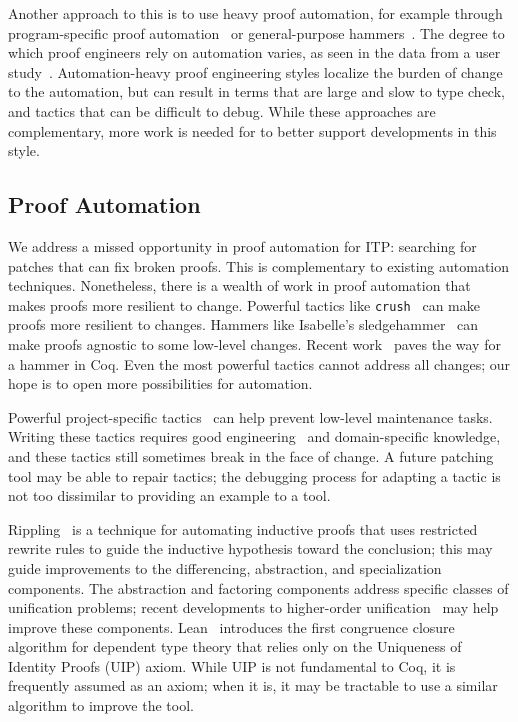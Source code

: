 Another approach to this is to use heavy proof automation, for example through
program-specific proof automation~\cite{Chlipala:2013:CPD:2584504}
or general-purpose hammers~\cite{Blanchette2016b, Blanchette2013, Kaliszyk2014, Czajka2018}.
The degree to which proof engineers rely on automation varies, as seen in the data from a user study~\cite{replica}.
Automation-heavy proof engineering styles localize the burden of change to the automation,
but can result in terms that are large and slow to type check,
and tactics that can be difficult to debug.
While these approaches are complementary, more work is needed for \toolname to better support 
developments in this style.

\subsection*{Proof Automation}


We address a missed opportunity in proof automation for ITP: searching
for patches that can fix broken proofs.
This is complementary to existing automation techniques. Nonetheless, there is a wealth
of work in proof automation that makes proofs more resilient to change.
Powerful tactics like \lstinline{crush}~\cite{chlipala:cpdt} can make
proofs more resilient to changes. 
Hammers like Isabelle's sledgehammer~\cite{Blanchette2013} can make proofs agnostic to some low-level changes.
Recent work~\cite{coqhammer} paves the way for a hammer in Coq.
Even the most powerful tactics cannot address all changes;
our hope is to open more possibilities for automation.

Powerful project-specific tactics~\cite{chlipala:cpdt, Chlipala2013} can help prevent low-level maintenance tasks.
Writing these tactics requires good engineering~\cite{Gonthier2011} and domain-specific knowledge,
and these tactics still sometimes break in the face of change.
A future patching tool may be able to repair tactics; the debugging process
for adapting a tactic is not too dissimilar to providing an example to a tool.

Rippling~\cite{rippling} is a technique for automating inductive proofs that uses restricted rewrite rules to
guide the inductive hypothesis toward the conclusion; this may guide improvements to the
differencing, abstraction, and specialization components.
The abstraction and factoring components address specific classes of unification problems;
recent developments to higher-order unification~\cite{Miller:2012:PHL:2331097} may help
improve these components.
Lean~\cite{selsam:lean} introduces the first congruence closure algorithm for dependent type theory that
relies only on the Uniqueness of Identity Proofs (UIP) axiom. While UIP is not fundamental to Coq,
it is frequently assumed as an axiom; when it is, it may be tractable to use a similar algorithm to improve the tool.

